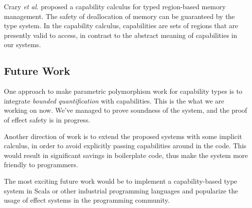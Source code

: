 Crary \emph{et al.} proposed a capability calculus for typed
region-based memory management\cite{crary1999typed}. The safety of
deallocation of memory can be guaranteed by the type system. In the
capability calculus, capabilities are sets of regions that are
presently valid to access, in contrast to the abstract meaning of
capabilities in our systems.

\subsection{Future Work}

One approach to make parametric polymorphism work for capability types
is to integrate \emph{bounded quantification} with capabilities. This
is the what we are working on now. We've managed to prove soundness of
the system, and the proof of effect safety is in progress.

Another direction of work is to extend the proposed systems with some
implicit calculus, in order to avoid explicitly passing capabilities
around in the code. This would result in significant savings in
boilerplate code, thus make the system more friendly to programmers.

The most exciting future work would be to implement a capability-based
type system in Scala or other industrial programming languages and
popularize the usage of effect systems in the programming community.
